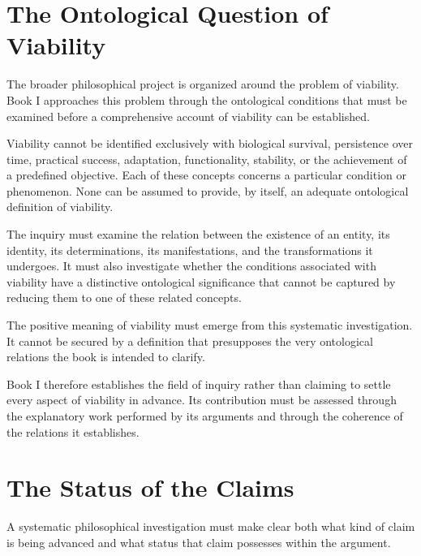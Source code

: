 
\section*{The Ontological Question of Viability}

The broader philosophical project is
organized around the problem of viability.
Book I approaches this problem through
the ontological conditions that must be
examined before a comprehensive account
of viability can be established.

Viability cannot be identified exclusively
with biological survival, persistence
over time, practical success, adaptation,
functionality, stability, or the achievement
of a predefined objective. Each of these
concepts concerns a particular condition
or phenomenon. None can be assumed to
provide, by itself, an adequate ontological
definition of viability.

The inquiry must examine the relation
between the existence of an entity, its
identity, its determinations, its
manifestations, and the transformations
it undergoes. It must also investigate
whether the conditions associated with
viability have a distinctive ontological
significance that cannot be captured
by reducing them to one of these related
concepts.

The positive meaning of viability must
emerge from this systematic investigation.
It cannot be secured by a definition
that presupposes the very ontological
relations the book is intended to clarify.

Book I therefore establishes the field
of inquiry rather than claiming to settle
every aspect of viability in advance.
Its contribution must be assessed through
the explanatory work performed by its
arguments and through the coherence
of the relations it establishes.



\section*{The Status of the Claims}

A systematic philosophical investigation
must make clear both what kind of claim
is being advanced and what status that
claim possesses within the argument.

